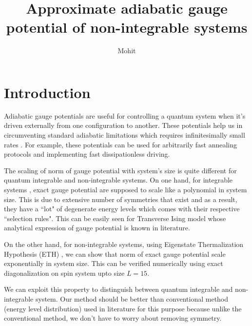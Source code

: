 \documentclass[11pt,a4paper]{article}
\author{Mohit}
\title{Approximate adiabatic gauge potential of non-integrable systems  }
\begin{document}
\maketitle
\tableofcontents

\section{Introduction}

Adiabatic gauge potentials are useful for controlling a quantum system when it's driven externally from one configuration to another. These potentials help us in  circumventing standard adiabatic limitations which requires infinitesimally small rates \cite{demirplak2003adiabatic,demirplak2005assisted, berry2009transitionless}. For example, these potentials can be used for arbitrarily fast annealing protocols and implementing fast dissipationless driving. 



The scaling of norm of gauge potential with system's size is quite different for  quantum integrable and non-integrable systems. On one hand, for integrable systems , exact gauge potential are supposed to scale like a polynomial in system size. This is due to extensive number of symmetries that exist and as a result, they have a ``lot" of degenerate energy levels which comes with their respective ``selection rules".  This can be easily seen  for Transverse Ising model whose analytical expression of gauge potential is known in literature.

On the other hand, for non-integrable systems, using  Eigenstate Thermalization Hypothesis (ETH)\cite{d2016quantum} , we can show that norm of exact gauge potential scale exponentially in system size. This can be verified numerically using exact diagonalization on spin system upto size $L=15$. 


We can exploit this property to distinguish  between quantum integrable and non-integrable system. Our method should be better than conventional method (energy level distribution) used in literature for this purpose because unlike the conventional method, we don't have to worry about removing symmetry.



 
\end{document}
